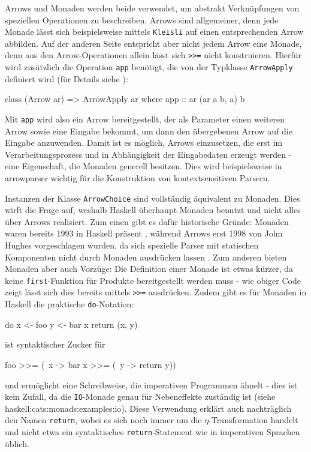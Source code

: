 \documentclass[11pt, a4paper, bibgerm]{book}
\newcommand\icode[1]{\lstinline?#1?}
\newcommand\sref{}
\begin{document}
Arrows und Monaden werden beide verwendet, um abstrakt Verknüpfungen von
speziellen Operationen zu beschreiben. Arrows sind allgemeiner, denn
jede Monade lässt sich beispielsweise mittels \icode{Kleisli} auf einen
entsprechenden Arrow abbilden. Auf der anderen Seite entspricht aber
nicht jedem Arrow eine Monade, denn aus den Arrow-Operationen allein
lässt sich \icode{>>=} %
nicht konstruieren. Hierfür wird zusätzlich die Operation \icode{app}
benötigt, die von der Typklasse \icode{ArrowApply} definiert wird (für
Details siehe \cite[S. 18f]{Hughes}):
\begin{code}
class (Arrow ar) => ArrowApply ar where
  app :: ar (ar a b, a) b
\end{code}
Mit \icode{app} wird also ein Arrow bereitgestellt, der als Parameter
einen weiteren Arrow sowie eine Eingabe bekommt, um dann den übergebenen
Arrow auf die Eingabe anzuwenden. Damit ist es möglich, Arrows
einzusetzen, die erst im Verarbeitungsprozess und in Abhängigkeit der
Eingabedaten erzeugt werden - eine Eigenschaft, die Monaden generell
besitzen. Dies wird beispielsweise in \sref{arrowparser} wichtig für
die Konstruktion von kontextsensitiven Parsern.

Instanzen der Klasse \icode{ArrowChoice} sind vollständig äquivalent zu
Monaden.  Dies wirft die Frage auf, weshalb Haskell überhaupt Monaden
benutzt und nicht alles über Arrows realisiert. Zum einen gibt es dafür
historische Gründe: Monaden waren bereits 1993 in Haskell präsent
\cite[S.23ff]{HaskellHistory}, während Arrows erst 1998 von John Hughes
vorgeschlagen wurden, da sich spezielle Parser mit statischen
Komponenten nicht durch Monaden ausdrücken lassen \cite{Hughes}. Zum
anderen bieten Monaden aber auch Vorzüge: Die Definition einer Monade
ist etwas kürzer, da keine \icode{first}-Funktion für Produkte
bereitgestellt werden muss - wie obiger Code zeigt lässt sich dies
bereits mittels \icode{>>=} %
ausdrücken. Zudem gibt es für Monaden in Haskell die praktische
\icode{do}-Notation:
\begin{code}
do x <- foo
   y <- bar x
   return (x, y)
\end{code}
ist syntaktischer Zucker für
\begin{code}
foo >>= (\ x ->
  bar x >>= (\ y ->
    return y))
\end{code} %
und ermöglicht eine Schreibweise, die imperativen Programmen ähnelt -
dies ist kein Zufall, da die \icode{IO}-Monade genau für Nebeneffekte
zuständig ist (siehe \sref{haskell:cats:monads:examples:io}). Diese
Verwendung erklärt auch nachträglich den Namen \icode{return}, wobei es
sich noch immer um die $\eta$-Transformation handelt und nicht etwa ein
syntaktisches \icode{return}-Statement wie in imperativen Sprachen
üblich.
\end{document}
